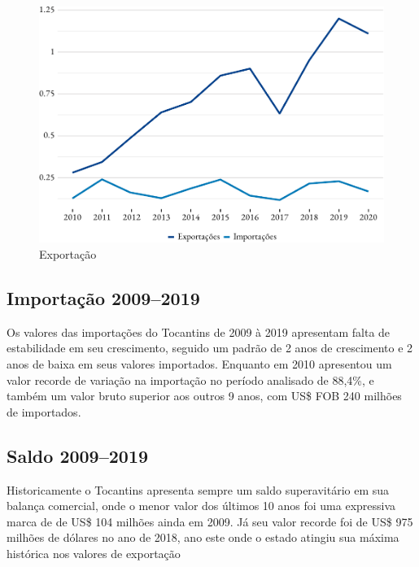 \begin{figure}[h]
	\caption{Exportação}
	\includegraphics{fig/total-1.pdf}
\end{figure}

\subsection{Importação 2009--2019}
\par Os valores das importações do Tocantins de 2009 à 2019 apresentam falta de estabilidade em seu crescimento, seguido um padrão de 2 anos de crescimento e 2 anos de baixa em seus valores importados. Enquanto em 2010 apresentou um valor recorde de variação na importação no período analisado de 88,4\%, e também um valor bruto superior aos outros 9 anos, com US\$ FOB 240 milhões de importados.

\subsection{Saldo 2009--2019}

\par Historicamente o Tocantins apresenta sempre um saldo superavitário em sua balança comercial, onde o menor valor dos últimos 10 anos foi uma expressiva marca de de US\$ 104 milhões ainda em 2009. Já seu valor recorde foi de US\$ 975 milhões de dólares no ano de 2018, ano este onde o estado atingiu sua máxima histórica nos valores de exportação

